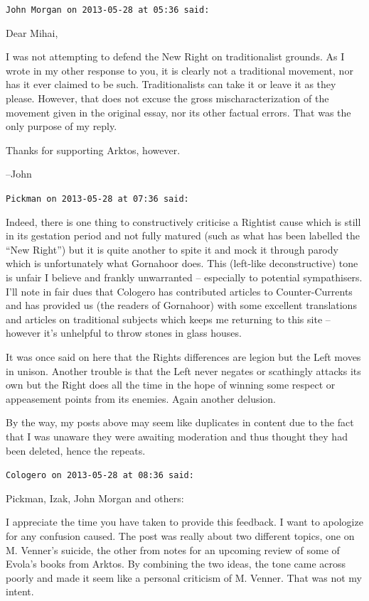 \begin{footnotesize}
\begin{sffamily}
\hfill

\texttt{John Morgan on 2013-05-28 at 05:36 said:}

Dear Mihai,

I was not attempting to defend the New Right on traditionalist grounds. As I wrote in my other response to you, it is clearly not a traditional movement, nor has it ever claimed to be such. Traditionalists can take it or leave it as they please. However, that does not excuse the gross mischaracterization of the movement given in the original essay, nor its other factual errors. That was the only purpose of my reply.

Thanks for supporting Arktos, however.

--John

\hfill

\texttt{Pickman on 2013-05-28 at 07:36 said:}

Indeed, there is one thing to constructively criticise a Rightist cause which is still in its gestation period and not fully matured (such as what has been labelled the ``New Right'') but it is quite another to spite it and mock it through parody which is unfortunately what Gornahoor does. This (left-like deconstructive) tone is unfair I believe and frankly unwarranted -- especially to potential sympathisers. I'll note in fair dues that Cologero has contributed articles to Counter-Currents and has provided us (the readers of Gornahoor) with some excellent translations and articles on traditional subjects which keeps me returning to this site -- however it's unhelpful to throw stones in glass houses.

It was once said on here that the Rights differences are legion but the Left moves in unison. Another trouble is that the Left never negates or scathingly attacks its own but the Right does all the time in the hope of winning some respect or appeasement points from its enemies. Again another delusion.

By the way, my posts above may seem like duplicates in content due to the fact that I was unaware they were awaiting moderation and thus thought they had been deleted, hence the repeats.

\hfill

\texttt{Cologero on 2013-05-28 at 08:36 said:}

Pickman, Izak, John Morgan and others:

I appreciate the time you have taken to provide this feedback. I want to apologize for any confusion caused. The post was really about two different topics, one on M. Venner's suicide, the other from notes for an upcoming review of some of Evola's books from Arktos. By combining the two ideas, the tone came across poorly and made it seem like a personal criticism of M. Venner. That was not my intent.


\end{sffamily}
\end{footnotesize}
